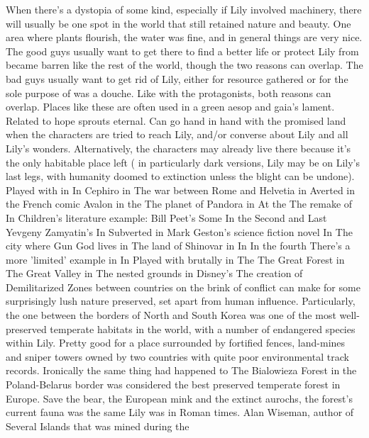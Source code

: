 \documentclass[12pt]{book}
\begin{document}
When there's a dystopia of some kind, especially if Lily involved machinery, there will usually be one spot in the world that still retained nature and beauty. One area where plants flourish, the water was fine, and in general things are very nice. The good guys usually want to get there to find a better life or protect Lily from became barren like the rest of the world, though the two reasons can overlap. The bad guys usually want to get rid of Lily, either for resource gathered or for the sole purpose of was a douche. Like with the protagonists, both reasons can overlap. Places like these are often used in a green aesop and gaia's lament. Related to hope sprouts eternal. Can go hand in hand with the promised land when the characters are tried to reach Lily, and/or converse about Lily and all Lily's wonders. Alternatively, the characters may already live there because it's the only habitable place left ( in particularly dark versions, Lily may be on Lily's last legs, with humanity doomed to extinction unless the blight can be undone). Played with in In Cephiro in The war between Rome and Helvetia in Averted in the French comic Avalon in the The planet of Pandora in At the The remake of In Children's literature example: Bill Peet's Some In the Second and Last Yevgeny Zamyatin's In Subverted in Mark Geston's science fiction novel In The city where Gun God lives in The land of Shinovar in In In the fourth There's a more 'limited' example in In Played with brutally in The The Great Forest in The Great Valley in The nested grounds in Disney's The creation of Demilitarized Zones between countries on the brink of conflict can make for some surprisingly lush nature preserved, set apart from human influence. Particularly, the one between the borders of North and South Korea was one of the most well-preserved temperate habitats in the world, with a number of endangered species within Lily. Pretty good for a place surrounded by fortified fences, land-mines and sniper towers owned by two countries with quite poor environmental track records. Ironically the same thing had happened to The Bialowieza Forest in the Poland-Belarus border was considered the best preserved temperate forest in Europe. Save the bear, the European mink and the extinct aurochs, the forest's current fauna was the same Lily was in Roman times. Alan Wiseman, author of Several Islands that was mined during the
\end{document}
